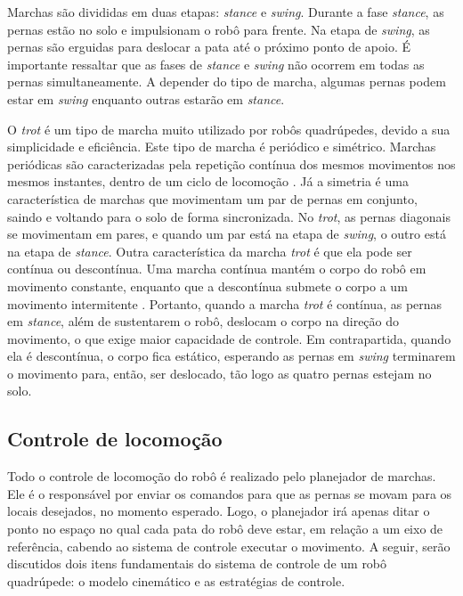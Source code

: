 \documentclass[conference]{IEEEtran}
\begin{document}
Marchas são divididas em duas etapas: \textit{stance} e \textit{swing}. Durante a fase \textit{stance}, as pernas estão no solo e impulsionam o robô para frente. Na etapa de \textit{swing}, as pernas são erguidas para deslocar a pata até o próximo ponto de apoio. É importante ressaltar que as fases de \textit{stance} e \textit{swing} não ocorrem em todas as pernas simultaneamente. A depender do tipo de marcha, algumas pernas podem estar em \textit{swing} enquanto outras estarão em \textit{stance}.

O \textit{trot} é um tipo de marcha muito utilizado por robôs quadrúpedes, devido a sua simplicidade e eficiência. Este tipo de marcha é periódico e simétrico. Marchas periódicas são caracterizadas pela repetição contínua dos mesmos movimentos nos mesmos instantes, dentro de um ciclo de locomoção \cite{de2006quadrupedal}. Já a simetria é uma característica de marchas que movimentam um par de pernas em conjunto, saindo e voltando para o solo de forma sincronizada. No \textit{trot}, as pernas diagonais se movimentam em pares, e quando um par está na etapa de \textit{swing}, o outro está na etapa de \textit{stance}. Outra característica da marcha \textit{trot} é que ela pode ser contínua ou descontínua. Uma marcha contínua mantém o corpo do robô em movimento constante, enquanto que a descontínua submete o corpo a um movimento intermitente \cite{de2006quadrupedal}. Portanto, quando a marcha \textit{trot} é contínua, as pernas em \textit{stance}, além de sustentarem o robô, deslocam o corpo na direção do movimento, o que exige maior capacidade de controle. Em contrapartida, quando ela é descontínua, o corpo fica estático, esperando as pernas em \textit{swing} terminarem o movimento para, então, ser deslocado, tão logo as quatro pernas estejam no solo.

\subsection{Controle de locomoção}

Todo o controle de locomoção do robô é realizado pelo planejador de marchas. Ele é o responsável por enviar os comandos para que as pernas se movam para os locais desejados, no momento esperado. Logo, o planejador irá apenas ditar o ponto no espaço no qual cada pata do robô deve estar, em relação a um eixo de referência, cabendo ao sistema de controle executar o movimento. A seguir, serão discutidos dois itens fundamentais do sistema de controle de um robô quadrúpede: o modelo cinemático e as estratégias de controle.
\end{document}
